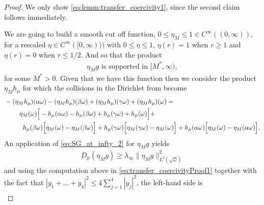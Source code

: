 \documentclass[reqno,11pt,letterpaper]{amsart}
\numberwithin{equation}{section}
\begin{document}
\begin{proof}
    We only show \eqref{eq:lemm:transfer_coercivity1}, since the second claim follows immediately. 
    
    We are going to build a smooth cut off function, 
    $0\leq \eta_M \leq 1 \in C^\infty((0,\infty))$, for a rescaled $\eta \in C^\infty([0,\infty)))$ with $ 0 \leq \eta \leq 1$, $\eta(r)=1$ when $r\geq 1$ and  $\eta(r)=0$ when $r\leq 1/2$. 
    And so that the product 
    \begin{align}\label{eq:eq:transfer_coercivityProof0.5}
    \eta_M g \text{ is supported in } [M^*, \infty), 
    \end{align}
    for some $M^*>0$. Given that we have this function then 
    we consider the product $\eta_M h_\mu$ for which the collisions in the Dirichlet from become 
    \begin{equation}\label{eq:transfer_coercivityProof1}
        \begin{split}
         &-(\eta_M h_\mu)(\alpha\omega) -(\eta_M h_\mu)(\beta\omega) + (\eta_M h_\mu)(\gamma\omega)  + (\eta_M h_\mu)(\omega) = \\ &
         \hspace{0.8cm}
         \eta_M(\omega) \Big[ 
         -h_\mu(\alpha\omega) - h_\mu(\beta\omega) + h_\mu(\gamma\omega) +h_\mu(\omega) \Big]  +  \\ 
         & \hspace{1cm}  h_\mu(\beta\omega)
         \Big[\eta_M (\omega) - \eta_M(\beta\omega)
         \Big] +h_\mu(\gamma\omega)
         \Big[\eta_M (\gamma\omega) - \eta_M(\omega)
         \Big] + h_\mu(\alpha\omega)
         \Big[\eta_M (\omega) - \eta_M(\alpha\omega)
         \Big].
        \end{split}
    \end{equation}
    An application of \eqref{eq:SG_at_infty_2} for $\eta_M g$ yields
    \begin{equation} \label{eq:transfer_coercivityProof1.5}
        \begin{split}
            D_\mu(\eta_M g) \geq \lambda_\infty \|\eta_M g\|_{L^2(\sqrt{\omega})}^2
        \end{split}
    \end{equation}
    and using the computation above in \eqref{eq:transfer_coercivityProof1} together with the fact that $|y_1 + \dots + y_4|^2 \le 4 \sum_{j=1}^4|y_j|^2$, the left-hand side is 
    \begin{equation} \label{eq:transfer_coercivityProof2}
    \begin{split}

\end{split}
\end{equation}
\end{proof}
\end{document}
